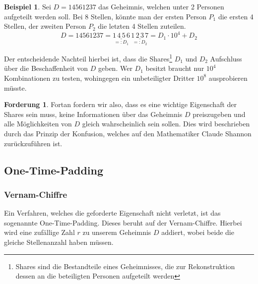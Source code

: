 \documentclass[12pt, a4paper, oneside, titlepage]{report}
\theoremstyle{definition}
\newtheorem{ford}[lemma]{Forderung}
\newtheorem{bsp}[lemma]{Beispiel}
\begin{document}
		\begin{bsp}
			Sei $ D = 14561237 $ das Geheimnis, welchen unter 2 Personen aufgeteilt werden soll. Bei 8 Stellen, könnte man der ersten Person $ P_1 $ die ersten 4 Stellen, der zweiten Person $ P_2 $ die letzten 4 Stellen zuteilen.
			$$ D = 14561237 = \underset{=:D_1}{\underline{1\,4\,5\,6}} \, \underset{=:D_2}{\underline{1\,2\,3\,7}} = D_1 \cdot 10^4 + D_2 $$
		\end{bsp}
		
		Der entscheidende Nachteil hierbei ist, dass die Shares\footnote{Shares sind die Bestandteile eines Geheimnisses, die zur Rekonstruktion dessen an die beteiligten Personen aufgeteilt werden} $ D_1 $ und $ D_2 $ Aufschluss über die Beschaffenheit von $ D $ geben. Wer $ D_1 $ besitzt braucht nur $ 10^4 $ Kombinationen zu testen, wohingegen ein unbeteiligter Dritter $ 10^8 $ ausprobieren müsste.
		\begin{ford}
			Fortan fordern wir also, dass es eine wichtige Eigenschaft der Shares sein muss, keine Informationen über das Geheimnis $ D $ preiszugeben und alle Möglichkeiten von $ D $ gleich wahrscheinlich sein sollen. Dies wird beschrieben durch das Prinzip der Konfusion, welches auf den Mathematiker Claude Shannon zurückzuführen ist.\cite{shannon}
		\end{ford}
		
	\subsection{One-Time-Padding}
	\subsubsection{Vernam-Chiffre}
		 Ein Verfahren, welches die geforderte Eigenschaft nicht verletzt, ist das sogenannte One-Time-Padding. Dieses beruht auf der Vernam-Chiffre. Hierbei wird eine zufällige Zahl $ r $ zu unserem Geheimnis $ D $  addiert, wobei beide die gleiche Stellenanzahl haben müssen.
	
\end{document}
